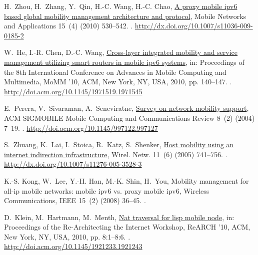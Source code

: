 \documentclass[preprint,12pt]{elsarticle}
\begin{document}
\begin{thebibliography}{10}
H.~Zhou, H.~Zhang, Y.~Qin, H.-C. Wang, H.-C. Chao,
  \href{http://dx.doi.org/10.1007/s11036-009-0185-2}{A proxy mobile ipv6 based
  global mobility management architecture and protocol}, Mobile Networks and
  Applications 15~(4) (2010) 530--542.
\newblock \href {http://dx.doi.org/10.1007/s11036-009-0185-2}
  {}.
\newline\urlprefix\url{http://dx.doi.org/10.1007/s11036-009-0185-2}

W.~He, I.-R. Chen, D.-C. Wang,
  \href{http://doi.acm.org/10.1145/1971519.1971545}{Cross-layer integrated
  mobility and service management utilizing smart routers in mobile ipv6
  systems}, in: Proceedings of the 8th International Conference on Advances in
  Mobile Computing and Multimedia, MoMM '10, ACM, New York, NY, USA, 2010, pp.
  140--147.
\newblock \href {http://dx.doi.org/10.1145/1971519.1971545}
  {}.
\newline\urlprefix\url{http://doi.acm.org/10.1145/1971519.1971545}

E.~Perera, V.~Sivaraman, A.~Seneviratne,
  \href{http://doi.acm.org/10.1145/997122.997127}{Survey on network mobility
  support}, ACM SIGMOBILE Mobile Computing and Communications Review 8~(2)
  (2004) 7--19.
\newblock \href {http://dx.doi.org/10.1145/997122.997127}
  {}.
\newline\urlprefix\url{http://doi.acm.org/10.1145/997122.997127}

S.~Zhuang, K.~Lai, I.~Stoica, R.~Katz, S.~Shenker,
  \href{http://dx.doi.org/10.1007/s11276-005-3528-3}{Host mobility using an
  internet indirection infrastructure}, Wirel. Netw. 11~(6) (2005) 741--756.
\newblock \href {http://dx.doi.org/10.1007/s11276-005-3528-3}
  {}.
\newline\urlprefix\url{http://dx.doi.org/10.1007/s11276-005-3528-3}

K.-S. Kong, W.~Lee, Y.-H. Han, M.-K. Shin, H.~You, Mobility management for
  all-ip mobile networks: mobile ipv6 vs. proxy mobile ipv6, Wireless
  Communications, IEEE 15~(2) (2008) 36--45.
\newblock \href {http://dx.doi.org/10.1109/MWC.2008.4492976}
  {}.

D.~Klein, M.~Hartmann, M.~Menth,
  \href{http://doi.acm.org/10.1145/1921233.1921243}{Nat traversal for lisp
  mobile node}, in: Proceedings of the Re-Architecting the Internet Workshop,
  ReARCH '10, ACM, New York, NY, USA, 2010, pp. 8:1--8:6.
\newblock \href {http://dx.doi.org/10.1145/1921233.1921243}
  {}.
\newline\urlprefix\url{http://doi.acm.org/10.1145/1921233.1921243}


\end{thebibliography}
\end{document}
